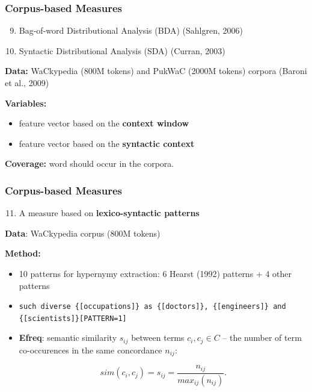 \documentclass{beamer}
\begin{document}
\begin{frame}
\frametitle{Corpus-based Measures}

\begin{enumerate}
   \setcounter{enumi}{8}
	\item Bag-of-word Distributional Analysis (BDA) (Sahlgren, 2006) 
	\item Syntactic Distributional Analysis (SDA) (Curran, 2003) 
\end{enumerate}

\textbf{Data:} WaCkypedia (800M tokens) and PukWaC (2000M tokens) corpora (Baroni et al., 2009) 
 
\textbf{Variables:} 
\begin{itemize}
  \item feature vector based on the \textbf{context window}
  \item feature vector based on the \textbf{syntactic context} 
\end{itemize}

\textbf{Coverage:} word should occur in the corpora.
	
\end{frame}

\begin{frame}
\frametitle{Corpus-based Measures }

\begin{enumerate}
  \setcounter{enumi}{10}
  \item A measure based on \textbf{lexico-syntactic patterns}   
\end{enumerate}	
 
\textbf{Data}: WaCkypedia corpus (800M tokens) 

\textbf{Method:}
\begin{itemize}
	\item 10 patterns for hypernymy extraction: 6 Hearst (1992) patterns + 4 other patterns
	
	\item \texttt{such diverse \{[occupations]\} as
  \{[doctors]\}, \{[engineers]\} and \{[scientists]\}[PATTERN=1]}
  
  \item \textbf{Efreq}: semantic similarity $s_{ij}$ between terms $c_i, c_j \in C$ -- 
 the number of term co-occurences in the same concordance $n_{ij}$:
  
   $$
   sim(c_i,c_j) = s_{ij} = \frac{n_{ij}}{max_{ij}(n_{ij})}.
   $$
\end{itemize}
 
 \end{frame}
 
\end{document}
